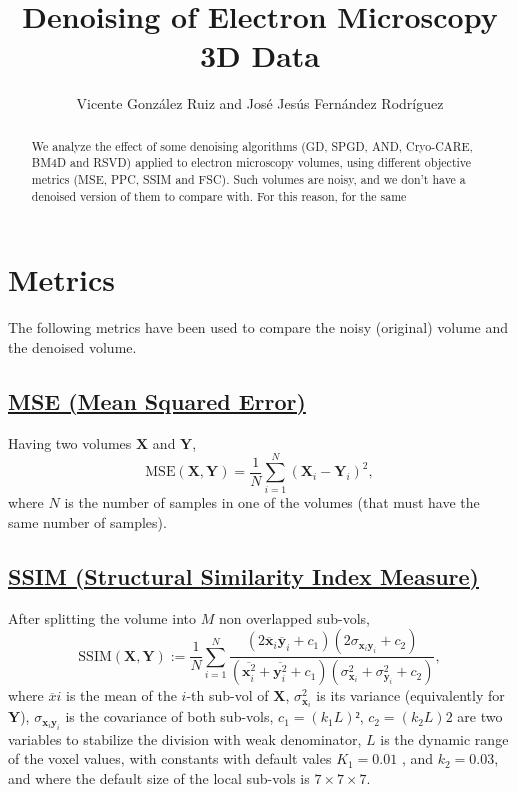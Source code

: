 \documentclass{article}
\title{Denoising of Electron Microscopy 3D Data}
\author{Vicente González Ruiz and José Jesús Fernández Rodríguez}
\begin{document}
\maketitle

\begin{abstract}
  We analyze the effect of some denoising algorithms (GD, SPGD, AND,
  Cryo-CARE, BM4D and RSVD) applied to electron microscopy volumes,
  using different objective metrics (MSE, PPC, SSIM and FSC). Such
  volumes are noisy, and we don't have a denoised version of them to
  compare with. For this reason, for the same 
\end{abstract}

\section{Metrics}

The following metrics have been used to compare the noisy (original)
volume and the denoised volume.

\subsection{\href{https://en.wikipedia.org/wiki/Mean_squared_error}{MSE (Mean
    Squared Error)}}

Having two volumes $\mathbf{X}$ and $\mathbf{Y}$,
\begin{equation}
  \text{MSE}(\mathbf{X},\mathbf{Y}) = \frac{1}{N}\sum_{i=1}^N(\mathbf{X}_i - \mathbf{Y}_i)^2,
\end{equation}
where $N$ is the number of samples in one of the volumes (that must
have the same number of samples).

\subsection{\href{https://en.wikipedia.org/wiki/Structural_similarity_index_measure}{SSIM
    (Structural Similarity Index Measure)}}

After splitting the volume into $M$ non overlapped sub-vols,
\begin{equation}
  \text{SSIM}(\mathbf{X}, \mathbf{Y}) := \frac{1}{N} \sum_{i=1}^N \frac{(2\overline{\mathbf{x}}_i \overline{\mathbf{y}}_i + c_1)(2\sigma_{\mathbf{x}_i \mathbf{y}_i} + c_2)}{(\overline{\mathbf{x}_i^2} + \overline{\mathbf{y}_i^2} + c_1)(\sigma^2_{\mathbf{x}_i} + \sigma^2_{\mathbf{y}_i} + c_2)},
\end{equation}
where $\overline{x}i$ is the mean of the $i$-th sub-vol of
$\mathbf{X}$, $\sigma^2_{\mathbf{x}_i}$ is its variance (equivalently
for $\mathbf{Y}$), $\sigma_{\mathbf{x}_i\mathbf{y}_i}$ is the
covariance of both sub-vols, $c_1=(k_1L) ²$, $c_2=(k_2L) 2$ are two
variables to stabilize the division with weak denominator, $L$ is the
dynamic range of the voxel values, with constants with default vales
$K_1=0.01$ , and $k_2=0.03$, and where the default size of the local
sub-vols is $7\times 7\times 7$.
\end{document}
